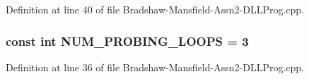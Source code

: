 Definition at line 40 of file Bradshaw-\/Mansfield-\/Assn2-\/DLLProg.cpp.

\hypertarget{_bradshaw-_mansfield-_assn2-_d_l_l_prog_8cpp_ac3e309d0e80c3dd569ed3cfb701075a8}{
\subsubsection[{NUM\_\-PROBING\_\-LOOPS}]{\setlength{\rightskip}{0pt plus 5cm}const int {\bf NUM\_\-PROBING\_\-LOOPS} = 3}}
\label{_bradshaw-_mansfield-_assn2-_d_l_l_prog_8cpp_ac3e309d0e80c3dd569ed3cfb701075a8}


Definition at line 36 of file Bradshaw-\/Mansfield-\/Assn2-\/DLLProg.cpp.

